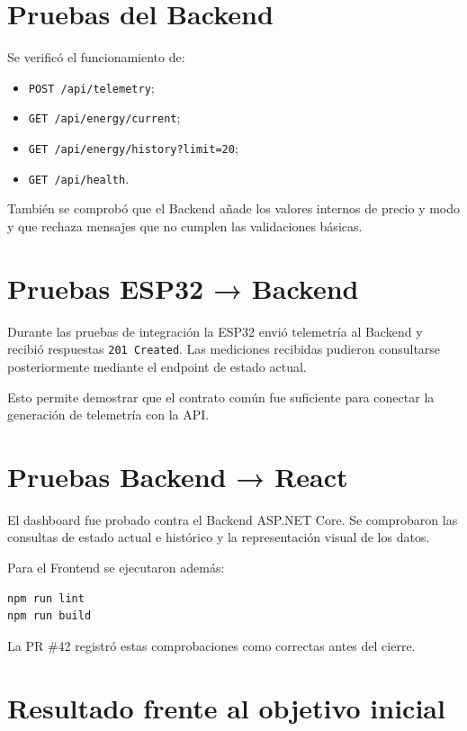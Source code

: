 \documentclass[11pt,a4paper,oneside]{report}
\begin{document}
\section{Pruebas del Backend}

Se verificó el funcionamiento de:

\begin{itemize}
\item \texttt{POST /api/telemetry};
\item \texttt{GET /api/energy/current};
\item \texttt{GET /api/energy/history?limit=20};
\item \texttt{GET /api/health}.
\end{itemize}

También se comprobó que el Backend añade los valores internos de precio y modo y que rechaza mensajes que no cumplen las validaciones básicas.

\section{Pruebas ESP32 → Backend}

Durante las pruebas de integración la ESP32 envió telemetría al Backend y recibió respuestas \texttt{201 Created}. Las mediciones recibidas pudieron consultarse posteriormente mediante el endpoint de estado actual.

Esto permite demostrar que el contrato común fue suficiente para conectar la generación de telemetría con la API.

\section{Pruebas Backend → React}

El dashboard fue probado contra el Backend ASP.NET Core. Se comprobaron las consultas de estado actual e histórico y la representación visual de los datos.

Para el Frontend se ejecutaron además:

\begin{verbatim}
npm run lint
npm run build
\end{verbatim}

La PR \#42 registró estas comprobaciones como correctas antes del cierre.

\section{Resultado frente al objetivo inicial}
\end{document}
